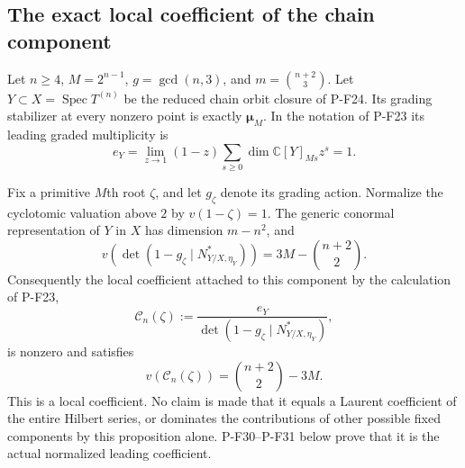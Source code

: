 \subsection{The exact local coefficient of the chain component}

\begin{proposition}
\label{prop:chainlocalcoefficient}
Let $n\ge4$, $M=2^{n-1}$, $g=\gcd(n,3)$, and
$m=\binom{n+2}{3}$. Let $Y\subset X=\operatorname{Spec}T^{(n)}$
be the reduced chain orbit closure of P-F24. Its grading
stabilizer at every nonzero point is exactly
$\boldsymbol\mu_M$. In the notation of P-F23 its leading
graded multiplicity is
\[
 e_Y=\lim_{z\to1}(1-z)
           \sum_{s\ge0}\dim\mathbb C[Y]_{Ms}z^s=1.
 \tag{P-F28a}
\]

Fix a primitive $M$th root $\zeta$, and let $g_\zeta$
denote its grading action. Normalize the cyclotomic
valuation above $2$ by $v(1-\zeta)=1$. The generic
conormal representation of $Y$ in $X$ has dimension
$m-n^2$, and
\[
 v\!\left(\det(1-g_\zeta\mid N^*_{Y/X,\eta_Y})\right)
       =3M-\binom{n+2}{2}.
 \tag{P-F28b}
\]
Consequently the local coefficient attached to this
component by the calculation of P-F23,
\[
 \mathcal C_n(\zeta):=
   \frac{e_Y}{\det(1-g_\zeta\mid N^*_{Y/X,\eta_Y})},
\]
is nonzero and satisfies
\[
 v(\mathcal C_n(\zeta))=\binom{n+2}{2}-3M.
 \tag{P-F28c}
\]
This is a local coefficient. No claim is made that it
equals a Laurent coefficient of the entire Hilbert series,
or dominates the contributions of other possible fixed components
by this proposition alone. P-F30--P-F31 below prove that it is
the actual normalized leading coefficient.
\end{proposition}

